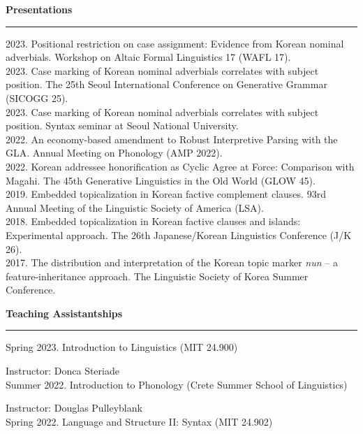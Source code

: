 \documentclass[11pt]{article}
\newcommand{\sect}[1]{{\fontsize{15}{25}\selectfont \textbf{#1}} {\vspace{0.1cm}} \hrule {\vspace{0.3cm}}}
\begin{document}
{\vspace{1cm}}

{\sect{Presentations}}

{2023. Positional restriction on case assignment: Evidence from Korean nominal adverbials. Workshop on Altaic Formal Linguistics 17 (WAFL 17).}\\

{2023. Case marking of Korean nominal adverbials correlates with subject position. The 25th Seoul International Conference on Generative Grammar (SICOGG 25).}\\

{2023. Case marking of Korean nominal adverbials correlates with subject position. Syntax seminar at Seoul National University. }\\

{2022. An economy-based amendment to Robust Interpretive Parsing with the GLA. Annual Meeting on Phonology (AMP 2022).}\\

{2022. Korean addressee honorification as Cyclic Agree at Force: Comparison with Magahi. The 45th Generative Linguistics in the Old World (GLOW 45).}\\

{2019. Embedded topicalization in Korean factive complement clauses. 93rd Annual Meeting of the Linguistic Society of America (LSA).}\\

{2018. Embedded topicalization in Korean factive clauses and islands: Experimental approach. The 26th Japanese/Korean Linguistics Conference (J/K 26).}\\

{2017. The distribution and interpretation of the Korean topic marker \textit{nun} -- a feature-inheritance approach. The Linguistic Society of Korea Summer Conference.}

{\vspace{1cm}}

\sect{Teaching Assistantships}

Spring 2023. Introduction to Linguistics (MIT 24.900)

{\hphantom{Spring 2023.}} Instructor: Donca Steriade\\

Summer 2022. Introduction to Phonology (Crete Summer School of Linguistics)

{\hphantom{Summer 2022.}} Instructor: Douglas Pulleyblank\\

Spring 2022. Language and Structure II: Syntax (MIT 24.902)
\end{document}
